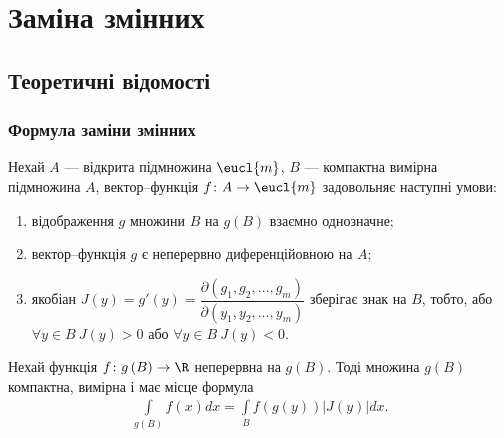 \part{Заміна змінних}
\chapter{Теоретичні відомості}
\section{Формула заміни змінних}
\begin{theorem}
Нехай $A$ --- відкрита підмножина $\eucl{m}$, $B$ --- компактна вимірна підмножина $A$, вектор--функція ${f\colon A\to\eucl{m}}$ задовольняє наступні умови:
\begin{enumerate}
\item відображення $g$ множини $B$ на ${g\left(B\right)}$ взаємно однозначне;
\item вектор--функція $g$ є неперервно диференційовною на $A$;
\item якобіан ${J(y) = g'(y) = \dfrac{\partial\left(g_1,g_2, \ldots, g_m\right)}{\partial\left(y_1,y_2, \ldots, y_m\right)}}$ зберігає знак на $B$, тобто, або ${\forall y\in B\ J(y)>0}$ або ${\forall y\in B\ J(y)<0}$.
\end{enumerate}
Нехай функція ${f\colon g\left(B\right)\to \R}$ неперервна на ${g\left(B\right)}$. Тоді множина ${g\left(B\right)}$ компактна, вимірна і має місце формула
\begin{align*}
\boxed{\int\limits_{g\left(B\right)} f(x) dx = \int\limits_{B} f\left(g\left(y\right)\right) \left|J(y)\right| dx.}
\end{align*}
\end{theorem}
